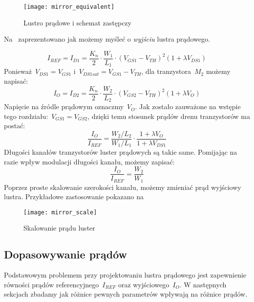\documentclass[twoside,pl,final]{labman}
\begin{document}
\begin{figure}[!htbp]
  \centering
  \texttt{[image: mirror\_equivalent]}
  \caption{Lustro prądowe i schemat zastępczy}
  \label{fig:mirror:basic:equivalent}
\end{figure}

Na~ zaprezentowano jak możemy myśleć
o \emph{wyjściu} lustra prądowego.

\begin{equation}
  I_{REF} = I_{D1} = \frac{K_n}{2} \cdot \frac{W_1}{L_1} \cdot (V_{GS1} - V_{TH}) ^ 2 (1 + \lambda V_{DS1})
  \label{eq:mirror:basic:iref}
\end{equation}
Ponieważ~$V_{DS1} = V_{GS1}$ i~$V_{DS1sat} = V_{GS1} - V_{TH}$,
dla tranzystora~$M_2$ możemy napisać:
\begin{equation}
  I_O = I_{D2} =  \frac{K_n}{2} \cdot \frac{W_2}{L_2} \cdot (V_{GS2} - V_{TH}) ^ 2 (1 + \lambda V_O)
  \label{eq:mirror:basic:iout}
\end{equation}
Napięcie na źródle prądowym oznaczmy~$V_O$.
Jak zostało zauważone na wstępie tego rozdziału:~$V_{GS1} = V_{GS2}$,
dzięki temu stosunek prądów drenu tranzystorów ma postać:
\begin{equation}
  \frac{I_O}{I_{REF}} = \frac{W_2 / L_2}{W_1 / L_1} \cdot \frac{1 + \lambda V_{O}}{1 + \lambda V_{DS1}}
  \label{eq:mirror:basic:iratio}
\end{equation}
Długości kanałów tranzystorów luster prądowych są takie same.
Pomijając na razie wpływ modulacji długości kanału,
możemy zapisać:
\begin{equation}
  \frac{I_O}{I_{REF}} = \frac{W_2}{W_1}
  \label{eq:mirror:basic:wratio}
\end{equation}
Poprzez proste skalowanie szerokości kanału,
możemy zmieniać prąd wyjściowy lustra.
Przykładowe zastosowanie pokazano na~

\begin{figure}[!htbp]
  \centering
  \texttt{[image: mirror\_scale]}
  \caption{Skalowanie prądu luster}
  \label{fig:mirror:basic:scale}
\end{figure}

\subsection{Dopasowywanie prądów}
\label{mirror:basic:matching}
Podstawowym problemem przy projektowaniu lustra prądowego
jest zapewnienie równości prądów referencyjnego~$I_{REF}$
oraz wyjściowego~$I_O$.
W następnych sekcjach zbadamy jak różnice pewnych parametrów
wpływają na różnice prądów.
\end{document}
